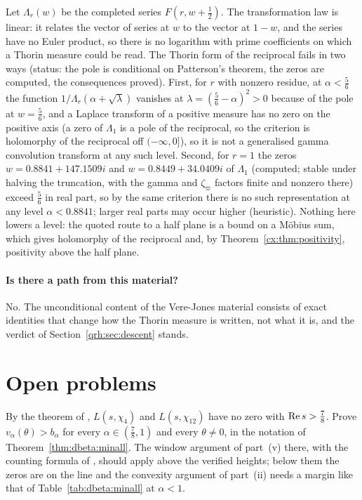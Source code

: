 \begin{remark}\label{qrh:rem:kubota}
Let $\Lambda_r(w)$ be the completed series $F(r,w+\frac12)$. The transformation law is linear: it relates the vector of series at $w$ to the vector at $1-w$, and the series have no Euler product, so there is no logarithm with prime coefficients on which a Thorin measure could be read. The Thorin form of the reciprocal fails in two ways (status: the pole is conditional on Patterson's theorem, the zeros are computed, the consequences proved). First, for $r$ with nonzero residue, at $\alpha<\frac56$ the function $1/\Lambda_r(\alpha+\sqrt\lambda)$ vanishes at $\lambda=(\frac56-\alpha)^2>0$ because of the pole at $w=\frac56$, and a Laplace transform of a positive measure has no zero on the positive axis (a zero of $\Lambda_1$ is a pole of the reciprocal, so the criterion is holomorphy of the reciprocal off $(-\infty,0]$), so it is not a generalised gamma convolution transform at any such level. Second, for $r=1$ the zeros $w=0.8841+147.1509i$ and $w=0.8449+34.0409i$ of $\Lambda_1$ (computed; stable under halving the truncation, with the gamma and $\zeta_\varpi$ factors finite and nonzero there) exceed $\frac56$ in real part, so by the same criterion there is no such representation at any level $\alpha<0.8841$; larger real parts may occur higher (heuristic). Nothing here lowers a level: the quoted route to a half plane is a bound on a M\"obius sum, which gives holomorphy of the reciprocal and, by Theorem~\ref{cx:thm:positivity}, positivity above the half plane.
\end{remark}

\paragraph{Is there a path from this material?} No. The unconditional content of the Vere-Jones material consists of exact identities that change how the Thorin measure is written, not what it is, and the verdict of Section~\ref{qrh:sec:descent} stands.

\section{Open problems}\label{qrh:sec:open}

\begin{problem}\label{qrh:prob:chi4}
By the theorem of \cite{OAI26a}, $L(s,\chi_4)$ and $L(s,\chi_{12})$ have no zero with $\operatorname{Re} s>\frac78$. Prove $v_\alpha(\theta)>b_\alpha$ for every $\alpha\in(\frac78,1)$ and every $\theta\ne0$, in the notation of Theorem~\ref{thm:dbeta:minall}. The window argument of part~(v) there, with the counting formula of \cite{BMOR21}, should apply above the verified heights; below them the zeros are on the line \cite{Platt16} and the convexity argument of part~(ii) needs a margin like that of Table~\ref{tab:dbeta:minall} at $\alpha<1$.
\end{problem}


